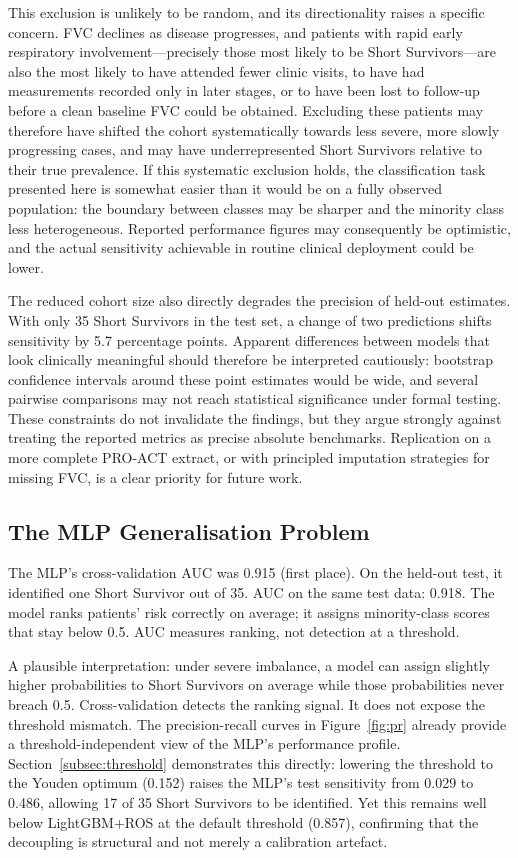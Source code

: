 \documentclass[preprint,12pt]{elsarticle}
\begin{document}
This exclusion is unlikely to be random, and its directionality raises a
specific concern. FVC declines as disease progresses, and patients with rapid
early respiratory involvement---precisely those most likely to be Short
Survivors---are also the most likely to have attended fewer clinic visits, to
have had measurements recorded only in later stages, or to have been lost to
follow-up before a clean baseline FVC could be obtained. Excluding these patients
may therefore have shifted the cohort systematically towards less severe, more
slowly progressing cases, and may have underrepresented Short Survivors relative
to their true prevalence. If this systematic exclusion holds, the classification
task presented here is somewhat easier than it would be on a fully observed
population: the boundary between classes may be sharper and the minority class
less heterogeneous. Reported performance figures may consequently be optimistic,
and the actual sensitivity achievable in routine clinical deployment could be lower.

The reduced cohort size also directly degrades the precision of held-out
estimates. With only 35 Short Survivors in the test set, a change of two
predictions shifts sensitivity by 5.7 percentage points. Apparent differences
between models that look clinically meaningful should therefore be interpreted
cautiously: bootstrap confidence intervals around these point estimates would be
wide, and several pairwise comparisons may not reach statistical significance
under formal testing. These constraints do not invalidate the findings, but they
argue strongly against treating the reported metrics as precise absolute
benchmarks. Replication on a more complete PRO-ACT extract, or with principled
imputation strategies for missing FVC, is a clear priority for future work.

\subsection{The MLP Generalisation Problem}

The MLP's cross-validation AUC was 0.915 (first place). On the held-out test,
it identified one Short Survivor out of 35. AUC on the same test data: 0.918.
The model ranks patients' risk correctly on average; it assigns minority-class
scores that stay below 0.5. AUC measures ranking, not detection at a threshold.

A plausible interpretation: under severe imbalance, a model can assign slightly
higher probabilities to Short Survivors on average while those probabilities
never breach 0.5. Cross-validation detects the ranking signal. It does not
expose the threshold mismatch. The precision-recall curves in Figure~\ref{fig:pr} already provide a
threshold-independent view of the MLP's performance profile.
Section~\ref{subsec:threshold} demonstrates this directly: lowering the threshold
to the Youden optimum (0.152) raises the MLP's test sensitivity from 0.029 to
0.486, allowing 17 of 35 Short Survivors to be identified. Yet this remains well
below LightGBM+ROS at the default threshold (0.857), confirming that the
decoupling is structural and not merely a calibration artefact.
\end{document}
